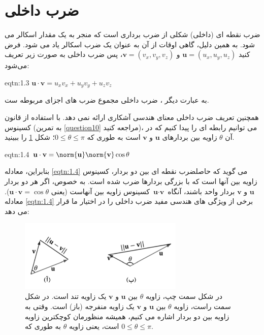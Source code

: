 \section{\textbf{ضرب داخلی}}
\label{sec:1.3}
{
    \Large
    \begin{spacing}{1.5}
        ضرب نقطه ای (داخلی) شکلی از ضرب برداری است که منجر به یک مقدار اسکالر می شود.
        به همین دلیل، گاهی اوقات از آن به عنوان یک ضرب اسکالر یاد می شود.
        فرض کنید $\textbf{u}=(u_{x},u_{y},u_{z})$ و  $\textbf{v}=(v_{x},v_{y},v_{z})$،
        پس ضرب داخلی به صورت زیر تعریف می‌شود:

        \begin{eqtn}{eqtn:1.3}
            \centering
            \LARGE
            $\textbf{u}\cdot\textbf{v}=u_{x}v_{x}+u_{y}v_{y}+u_{z}v_{z}$
        \end{eqtn}

        به عبارت دیگر ، ضرب داخلی مجموع ضرب های اجزای مربوطه ست.

        همچنین تعریف ضرب داخلی معنای هندسی آشکاری ارائه نمی دهد.
        با استفاده از قانون کسینوس (به تمرین \ref{question10} مراجعه کنید)، می توانیم رابطه ای را پیدا کنیم که در آن $\theta$ زاویه بین بردارهای $\textbf{u}$ و $\textbf{v}$ است به طوری که $0\leq\theta\leq\pi$؛ شکل \ref{fig:4.Session.1.1.9} را ببینید.

        \begin{eqtn}{eqtn:1.4}
            \centering
            \LARGE
            $\textbf{u}\cdot\textbf{v}=\norm{\textbf{u}}\norm{\textbf{v}}\cos\theta$
        \end{eqtn}

        بنابراین، معادله \ref{eqtn:1.4} می گوید که حاصلضرب نقطه ای بین دو بردار، کسینوس زاویه بین آنها است که با بزرگی بردارها ضرب شده است.
        به خصوص، اگر هر دو بردار $\textbf{u}$ و $\textbf{v}$ بردار واحد باشند،
        آنگاه $\textbf{u}\cdot\textbf{v}$ کسینوس زاویه بین آنهاست (یعنی $\textbf{u}\cdot\textbf{v}=\cos\theta$).
        معادله \ref{eqtn:1.4} برخی از ویژگی های هندسی مفید ضرب داخلی را در اختیار ما قرار می دهد:

        \begin{figure}[H]
            \centering
            \setlength{\belowcaptionskip}{-10pt}
            \includegraphics[width=0.7\textwidth]{Images/4/1/4.Session.1.1.9}
            \caption{در شکل سمت چپ، زاویه $\theta$ بین $\textbf{u}$ و $\textbf{v}$ یک زاویه تند است.
            در شکل سمت راست، زاویه $\theta$ بین $\textbf{u}$ و $\textbf{v}$ یک زاویه منفرجه (باز) است.
            وقتی به زاویه بین دو بردار اشاره می کنیم، همیشه منظورمان کوچکترین زاویه است،
            یعنی زاویه $\theta$ به طوری که $0\leq\theta\leq\pi$.}
            \label{fig:4.Session.1.1.9}
        \end{figure}


\end{spacing}}
